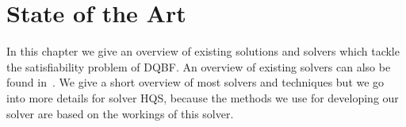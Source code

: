 \documentclass[
  digital, %
  twoside, %
  table,   %
  nolof,     %
  nolot,     %
]{fithesis3}
\theoremstyle{definition}
\theoremstyle{remark}
\begin{document}


\chapter{State of the Art}




In this chapter we give an overview of existing solutions and solvers which tackle the satisfiability problem of DQBF. An overview of existing solvers can also be found in~\cite{DQBFStateOfArtTalk,DQBFStateOfArt,DQBFStateOfArtNew}. We give a short overview of most solvers and techniques but %
we go into more details for solver HQS, because the methods we use for developing our solver are based on the workings of this solver.
\end{document}
